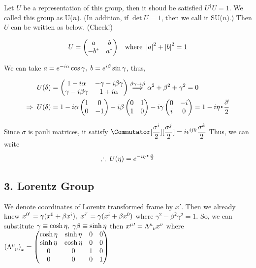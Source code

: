 \documentclass[11pt,letterpaper]{article}
\begin{document}
Let $U$ be a representation of this group, then it shoud be satisfied $U^{\dagger}U = 1$. We called this group as
U($n$). (In addition, if $\det U = 1$, then we call it SU($n$).) Then $U$ can be written as below. (Check!)

\begin{align}
 U =
 \begin{pmatrix}
  a & b \\
  -b^* & a^*
 \end{pmatrix}
 \hspace{0.3cm} \text{where }\left|a\right|^2 + \left|b\right|^ 2 = 1 
\end{align}

We can take $a = e^{-i\alpha}\cos\gamma,\hspace{0.1cm} b=e^{i\beta}\sin\gamma$, thus,

\begin{align}
\nonumber
 U(\delta) &=
 \begin{pmatrix}
  1-i\alpha & -\gamma-i\beta\gamma \\
  \gamma - i \beta\gamma & 1+i\alpha
 \end{pmatrix}
 \overset{\beta\gamma\rightarrow\beta}{\Longrightarrow} \alpha^2+\beta^2+\gamma^2 = 0 \\
 \Rightarrow \hs U(\delta) &= 1 - i\alpha\Pz -i\beta\Px -i\gamma\Py = 1 - i \eta \ld \frac{\vec{\sigma}}{2}
\end{align}

Since $\sigma$ is pauli matrices, it satisfy $\Commutator[\dfrac{\sigma^i}{2}][\dfrac{\sigma^j}{2}] = i\eps^{ijk}\dfrac{\sigma^k}{2}$
Thus, we can write 
\begin{equation}
\therefore \hs U(\eta) = e^{-i\eta\ld\frac{\sigma}{2}}
\end{equation}

\newpage

\subsection*{3. Lorentz Group}

We denote coordinates of Lorentz transformed frame by $x'$. Then we already knew  \newline $\tensor{x}{^{0'}}=\gamma(x^0+\beta x^i)\Com
\tensor{x}{^i^'}=\gamma(x^i+\beta x^0)$ where $\gamma^2 -\beta^2\gamma^2 = 1$. So, we can substitute 
$\gamma \equiv \cosh\eta,\hspace{0.1cm} \gamma\beta \equiv \sinh \eta$ then $\tensor{x}{^\mu}' = \tensor{\Lambda}{^\mu_\nu}x^\nu$
where $\BKS{\tensor{\Lambda}{^\mu_\nu}}_x=
\begin{pmatrix}
 \cosh\eta & \sinh \eta & 0 & 0 \\
 \sinh\eta & \cosh \eta & 0 & 0 \\
 0 & 0 & 1 & 0 \\
 0 & 0 & 0 & 1
\end{pmatrix}$
\end{document}
